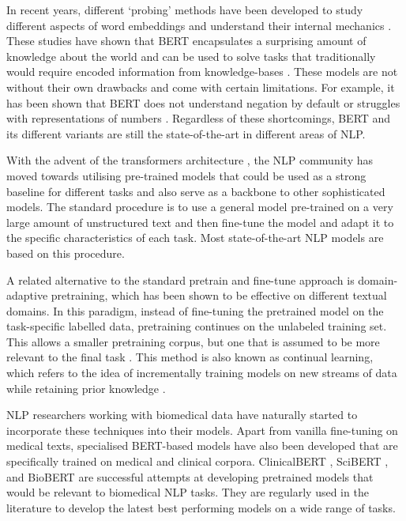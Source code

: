 \documentclass{article}
\begin{document}
In recent years, different `probing' methods have been developed to study different aspects of word embeddings and understand their internal mechanics \citep{conneau-etal-2018-cram,jawahar2019does, clark2019does}. These studies have shown that BERT encapsulates a surprising amount of knowledge about the world and can be used to solve tasks that traditionally would require encoded information from knowledge-bases \citep{rogers2020primer}. These models are not without their own drawbacks and come with certain limitations. For example, it has been shown that BERT does not understand negation by default \citep{ettinger2020bert} or struggles with representations of numbers \citep{wallace2019nlp}. Regardless of these shortcomings, BERT and its different variants are still the state-of-the-art in different areas of NLP. 

With the advent of the transformers architecture \citep{vaswani2017attention}, the NLP community has moved towards utilising pre-trained models that could be used as a strong baseline for different tasks and also serve as a backbone to other sophisticated models. The standard procedure is to use a general model pre-trained on a very large amount of unstructured text and then fine-tune the model and adapt it to the specific characteristics of each task. Most state-of-the-art NLP models are based on this procedure.   

A related alternative to the standard pretrain and fine-tune approach is domain-adaptive pretraining, which has been shown to be effective on different textual domains. In this paradigm, instead of fine-tuning the pretrained model on the task-specific labelled data, pretraining continues on the unlabeled training set. This allows a smaller pretraining corpus, but one that is assumed to be more relevant to the final task \citep{gururangan-etal-2020-dont}. This method is also known as continual learning, which refers to the idea of incrementally training models on new streams of data while retaining prior knowledge \citep{PARISI201954}.  

NLP researchers working with biomedical data have naturally started to incorporate these techniques into their models. Apart from vanilla fine-tuning on medical texts, specialised BERT-based models have also been developed that are specifically trained on medical and clinical corpora. ClinicalBERT \citep{huang2019clinicalbert}, SciBERT \citep{beltagy2019scibert}, and BioBERT \citep{lee2020biobert} are successful attempts at developing pretrained models that would be relevant to biomedical NLP tasks. They are regularly used in the literature to develop the latest best performing models on a wide range of tasks. 
\end{document}
